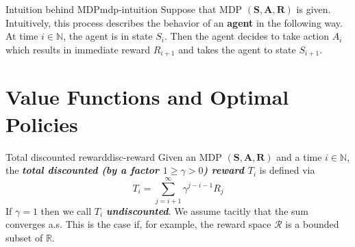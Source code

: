 \documentclass[a4paper, 11pt]{article}
\numberwithin{equation}{section}
\theoremstyle{plain}
\theoremstyle{definition}
\newcommand{\1}{{\mathbbm 1}}
\newcommand{\mb}[1]{\mathbf{#1}}
\newcommand{\mc}[1]{\mathcal{#1}}
\newcommand{\bi}[1]{\textbf{\textit{#1}}}
\newcommand{\R}{{\mathbb{R}}}
\newcommand{\N}{{\mathbb{N}}}
\begin{document}
	\begin{frema}{Intuition behind MDP}{mdp-intuition}
		Suppose that MDP $(\mb{S}, \mb{A}, \mb{R})$ is given. Intuitively, this process describes the behavior of an \textbf{agent} in the following way. At time $i \in \N$, the agent is in state $S_i$. Then the agent decides to take action $A_i$ which results in immediate reward $R_{i + 1}$ and takes the agent to state $S_{i + 1}$.
	\end{frema}
	
	\section{Value Functions and Optimal Policies}
	
	\begin{fdefi}{Total discounted reward}{disc-reward}
		Given an MDP $(\mb{S}, \mb{A}, \mb{R})$ and a time $i \in \N$, the \bi{total discounted (by a factor $1 \ge \gamma > 0$) reward $T_i$} is defined via
		\begin{equation}
			T_i = \sum\limits_{j = i + 1}^{\infty} \gamma^{j - i - 1} R_j 
		\end{equation}
		If $\gamma  = 1$ then we call $T_i$ \bi{undiscounted}. We assume tacitly that the sum converges a.s. This is the case if, for example, the reward space $\mc{R}$ is a bounded subset of $\R$.
	\end{fdefi}
	
\end{document}

